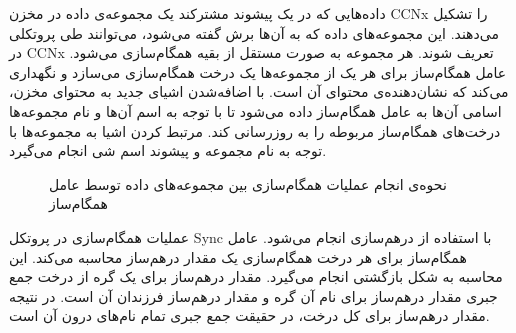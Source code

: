 داده‌هایی که در یک پیشوند مشترکند یک مجموعه‌ی داده در مخزن CCNx را تشکیل می‌دهند. این مجموعه‌های داده که به آن‌ها برش گفته می‌شود، می‌توانند طی پروتکلی در CCNx تعریف شوند. هر مجموعه به صورت مستقل از بقیه همگام‌سازی می‌شود. عامل همگام‌ساز برای هر یک از مجموعه‌ها یک درخت همگام‌سازی می‌سازد و نگهداری می‌کند که نشان‌دهنده‌ی محتوای آن است. با اضافه‌شدن اشیای جدید به محتوای مخزن، اسامی آن‌ها به عامل همگام‌ساز داده می‌شود تا با توجه به اسم آن‌ها و نام مجموعه‌ها درخت‌های همگام‌ساز مربوطه را به روزرسانی کند. مرتبط کردن اشیا به مجموعه‌ها با توجه به نام مجموعه و پیشوند اسم شی انجام می‌گیرد.
\begin{figure}[h!]
\centering
\caption{نحوه‌ی انجام عملیات همگام‌سازی بین مجموعه‌های داده توسط عامل همگام‌ساز}
\label{fig:Sync1}
\end{figure}

عملیات همگام‌سازی در پروتکل Sync با استفاده از در‌هم‌سازی انجام می‌شود. عامل همگام‌ساز برای هر درخت همگام‌سازی یک مقدار در‌هم‌ساز محاسبه می‌کند. این محاسبه به شکل بازگشتی انجام می‌گیرد. مقدار درهم‌ساز برای یک گره از درخت جمع جبری مقدار در‌هم‌ساز برای نام آن گره و مقدار در‌هم‌ساز فرزندان آن است. در نتیجه مقدار در‌هم‌ساز برای کل درخت، در حقیقت جمع جبری تمام نا‌م‌های درون آن است. 

